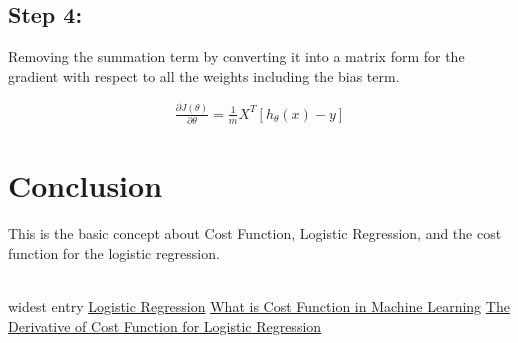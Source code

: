 \documentclass[10pt,a4paper]{article}
\begin{document}
\subsection*{Step 4:}
Removing the summation term by converting it into a matrix form for the gradient with respect to all the weights including the bias term.

\begin{equation*}
\begin{array}{l}
\frac{\partial J(\theta)}{\partial \theta} = \frac{1}{m}X^{T}[h_\theta(x) - y] 
\end{array}
\end{equation*}

\section{Conclusion}
This is the basic concept about Cost Function, Logistic Regression, and the cost function for the logistic regression.
\\
\\
%
% 

\printbibliography[heading=none]
\begin {thebibliography}{widest entry}
 \href{https://ml-cheatsheet.readthedocs.io/en/latest/logistic_regression.html}{Logistic Regression}
 \href{https://www.simplilearn.com/tutorials/machine-learning-tutorial/cost-function-in-machine-learning}{What is Cost Function in Machine Learning}
 \href{https://medium.com/analytics-vidhya/derivative-of-log-loss-function-for-logistic-regression-9b832f025c2d}{The Derivative of Cost Function for Logistic Regression}

\end{thebibliography}
\end{document}
